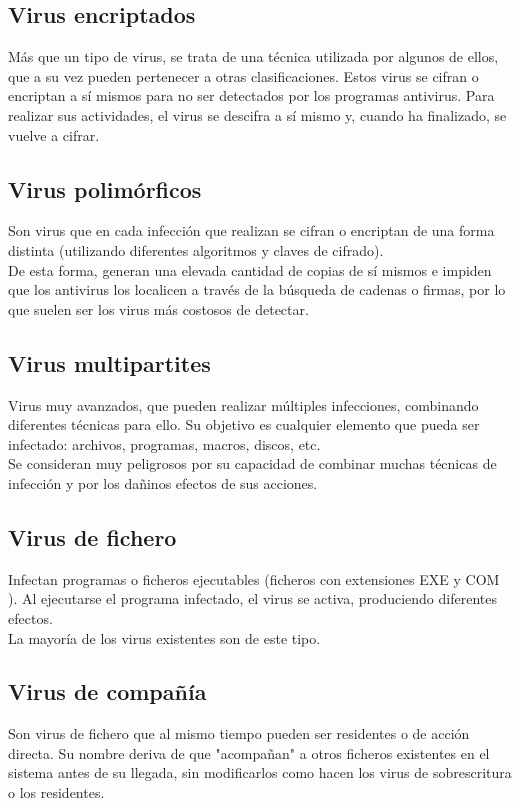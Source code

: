 \documentclass[12pt,a4paper]{article}
\begin{document}
	\subsection{Virus encriptados}
	Más que un tipo de virus, se trata de una técnica utilizada por algunos de ellos, que a su vez pueden pertenecer a otras clasificaciones.
	Estos virus se cifran o encriptan a sí mismos para no ser detectados por los programas antivirus. Para realizar sus actividades, el virus se descifra a sí mismo y, cuando ha finalizado, se vuelve a cifrar.
	
	\subsection{Virus polimórficos}
	Son virus que en cada infección que realizan se cifran o encriptan de una forma distinta (utilizando diferentes algoritmos y claves de cifrado).\\
	
	De esta forma, generan una elevada cantidad de copias de sí mismos e impiden que los antivirus los localicen a través de la búsqueda de cadenas o firmas, por lo que suelen ser los virus más costosos de detectar.
	
	\subsection{Virus multipartites}
	Virus muy avanzados, que pueden realizar múltiples infecciones, combinando diferentes técnicas para ello. Su objetivo es cualquier elemento que pueda ser infectado: archivos, programas, macros, discos, etc.\\
	
	Se consideran muy peligrosos por su capacidad de combinar muchas técnicas de infección y por los dañinos efectos de sus acciones.
	
	\subsection{Virus de fichero}
	Infectan programas o ficheros ejecutables (ficheros con extensiones EXE y COM ). Al ejecutarse el programa infectado, el virus se activa, produciendo diferentes efectos.\\
	
	La mayoría de los virus existentes son de este tipo.
	
	\subsection{Virus de compañía}
	Son virus de fichero que al mismo tiempo pueden ser residentes o de acción directa. Su nombre deriva de que "acompañan" a otros ficheros existentes en el sistema antes de su llegada, sin modificarlos como hacen los virus de sobrescritura o los residentes.\\
	
\end{document}
